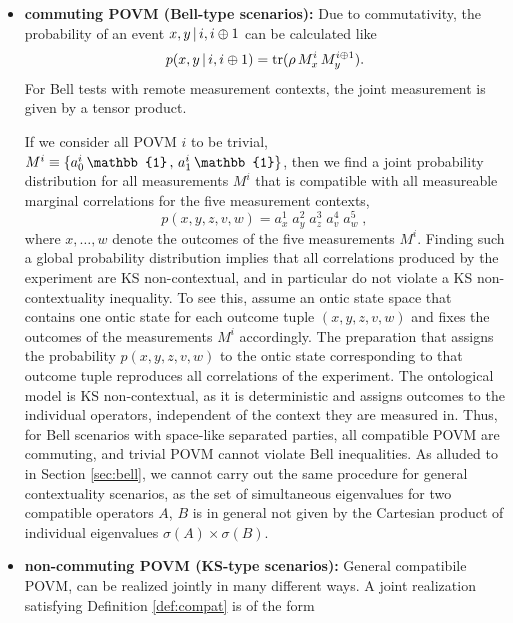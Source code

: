 \begin{itemize}
    \item \textbf{commuting POVM (Bell-type scenarios):}
    Due to commutativity, the probability of an event $x,y\thinspace\vert\thinspace i,i\oplus 1$ can be calculated like
    \begin{equation*}
        p(x,y\thinspace\vert\thinspace i,i\oplus 1) = \operatorname{tr}(\rho\thinspace M_x^i\thinspace M_y^{i\oplus 1}).
    \end{equation*}
    For Bell tests with remote measurement contexts, the joint measurement is given by a tensor product.
    
    If we consider all POVM $i$ to be trivial, $M^i\equiv\{a^i_0\thinspace\mathbb{1}\thinspace,\thinspace a^i_1\thinspace\mathbb{1}\}$, then we find a joint probability distribution for all measurements $M^i$ that is compatible with all measureable marginal correlations for the five measurement contexts,
    \begin{equation*}
        p(x,y,z,v,w)=a^1_{x}\;a^2_{y}\;a^3_{z}\;a^4_{v}\;a^5_{w}\;,
    \end{equation*}
    where $x,\dots,w$ denote the outcomes of the five measurements $M^i$. Finding such a global probability distribution implies that all correlations produced by the experiment are KS non-contextual, and in particular do not violate a KS non-contextuality inequality. To see this, assume an ontic state space that contains one ontic state for each outcome tuple $(x,y,z,v,w)$ and fixes the outcomes of the measurements $M^i$ accordingly. The preparation that assigns the probability $p(x,y,z,v,w)$ to the ontic state corresponding to that outcome tuple reproduces all correlations of the experiment. The ontological model is KS non-contextual, as it is deterministic and assigns outcomes to the individual operators, independent of the context they are measured in. Thus, for Bell scenarios with space-like separated parties, all compatible POVM are commuting, and trivial POVM cannot violate Bell inequalities. As alluded to in Section \ref{sec:bell}, we cannot carry out the same procedure for general contextuality scenarios, as the set of simultaneous eigenvalues for two compatible operators $A$, $B$ is in general not given by the Cartesian product of individual eigenvalues $\sigma(A)\times\sigma(B)$.
    \item \textbf{non-commuting POVM (KS-type scenarios):}
    General compatibile POVM, can be realized jointly in many different ways. A joint realization satisfying Definition \ref{def:compat} is of the form \begin{equation*}

\end{equation*}
\end{itemize}
